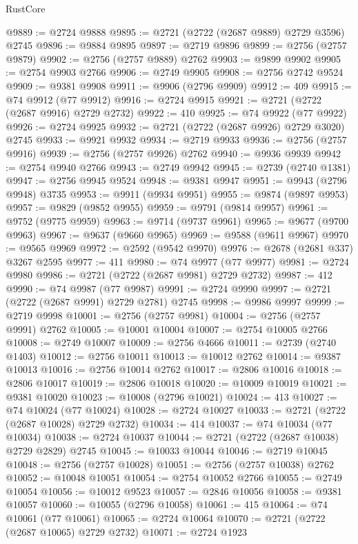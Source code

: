\begin{lexlean}{RustCore}
\begin{coremodule}
@9889 := @2724 @9888
@9895 := @2721 (@2722 (@2687 @9889) @2729 @3596) @2745
@9896 := @9884 @9895
@9897 := @2719 @9896
@9899 := @2756 (@2757 @9879)
@9902 := @2756 (@2757 @9889) @2762
@9903 := @9899 @9902
@9905 := @2754 @9903 @2766
@9906 := @2749 @9905
@9908 := @2756 @2742 @9524
@9909 := @9381 @9908
@9911 := @9906 (@2796 @9909)
@9912 := 409
@9915 := @74 @9912 (@77 @9912)
@9916 := @2724 @9915
@9921 := @2721 (@2722 (@2687 @9916) @2729 @2732)
@9922 := 410
@9925 := @74 @9922 (@77 @9922)
@9926 := @2724 @9925
@9932 := @2721 (@2722 (@2687 @9926) @2729 @3020) @2745
@9933 := @9921 @9932
@9934 := @2719 @9933
@9936 := @2756 (@2757 @9916)
@9939 := @2756 (@2757 @9926) @2762
@9940 := @9936 @9939
@9942 := @2754 @9940 @2766
@9943 := @2749 @9942
@9945 := @2739 (@2740 @1381)
@9947 := @2756 @9945 @9524
@9948 := @9381 @9947
@9951 := @9943 (@2796 @9948) @3735
@9953 := @9911 (@9934 @9951)
@9955 := @9874 (@9897 @9953)
@9957 := @9829 (@9852 @9955)
@9959 := @9791 (@9814 @9957)
@9961 := @9752 (@9775 @9959)
@9963 := @9714 (@9737 @9961)
@9965 := @9677 (@9700 @9963)
@9967 := @9637 (@9660 @9965)
@9969 := @9588 (@9611 @9967)
@9970 := @9565 @9969
@9972 := @2592 (@9542 @9970)
@9976 := @2678 (@2681 @337) @3267 @2595
@9977 := 411
@9980 := @74 @9977 (@77 @9977)
@9981 := @2724 @9980
@9986 := @2721 (@2722 (@2687 @9981) @2729 @2732)
@9987 := 412
@9990 := @74 @9987 (@77 @9987)
@9991 := @2724 @9990
@9997 := @2721 (@2722 (@2687 @9991) @2729 @2781) @2745
@9998 := @9986 @9997
@9999 := @2719 @9998
@10001 := @2756 (@2757 @9981)
@10004 := @2756 (@2757 @9991) @2762
@10005 := @10001 @10004
@10007 := @2754 @10005 @2766
@10008 := @2749 @10007
@10009 := @2756 @4666
@10011 := @2739 (@2740 @1403)
@10012 := @2756 @10011
@10013 := @10012 @2762
@10014 := @9387 @10013
@10016 := @2756 @10014 @2762
@10017 := @2806 @10016
@10018 := @2806 @10017
@10019 := @2806 @10018
@10020 := @10009 @10019
@10021 := @9381 @10020
@10023 := @10008 (@2796 @10021)
@10024 := 413
@10027 := @74 @10024 (@77 @10024)
@10028 := @2724 @10027
@10033 := @2721 (@2722 (@2687 @10028) @2729 @2732)
@10034 := 414
@10037 := @74 @10034 (@77 @10034)
@10038 := @2724 @10037
@10044 := @2721 (@2722 (@2687 @10038) @2729 @2829) @2745
@10045 := @10033 @10044
@10046 := @2719 @10045
@10048 := @2756 (@2757 @10028)
@10051 := @2756 (@2757 @10038) @2762
@10052 := @10048 @10051
@10054 := @2754 @10052 @2766
@10055 := @2749 @10054
@10056 := @10012 @9523
@10057 := @2846 @10056
@10058 := @9381 @10057
@10060 := @10055 (@2796 @10058)
@10061 := 415
@10064 := @74 @10061 (@77 @10061)
@10065 := @2724 @10064
@10070 := @2721 (@2722 (@2687 @10065) @2729 @2732)
@10071 := @2724 @1923

\end{coremodule}
\end{lexlean}
